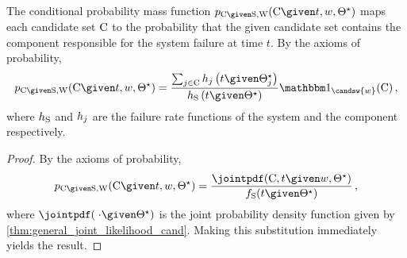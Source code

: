 \documentclass[../main.tex]{subfiles}
\begin{document}
\begin{corollary}
\label{def:general_cond_cand_probability}
The conditional probability mass function $\pmf_{\rvcand \given \sv, \RV{W}}(\cand \given t, w, \tparam\sysparam)$ maps each candidate set $\mathrm{C}$ to the probability that the given candidate set contains the component responsible for the system failure at time $t$. By the axioms of probability,
\begin{equation}
\label{eq:general_cond_cand_probability}
    \pmf_{\rvcand \given \sv, \RV{W}}(\cand \given t, w, \tparam\sysparam) = \frac
    {
        \sum_{j \in \cand} \haz_j\left(t \given \tparam\sysparam_j\right)
    }
    {
        \haz_{\sv}\left(t \given \tparam\sysparam\right)
    } \SetIndicator{\candsw{w}}(\cand)\,,
\end{equation}
where $h_{\mathrm{S}}$ and $h_j$ are the failure rate functions of the system 
and the \jth component respectively.
\end{corollary}
\begin{proof}
By the axioms of probability,
\begin{equation}
    \pmf_{\rvcand \given \sv, \RV{W}}(\cand \given t, w, \tparam\sysparam) = \frac
    {
        \jointpdf(\cand, t \given w, \tparam\sysparam)
    }
    {
        \spdf(t \given \tparam\sysparam)
    }\,,
\end{equation}
where $\jointpdf(\; \cdot \given \tparam\sysparam)$ is the joint probability density function given by \cref{thm:general_joint_likelihood_cand}. Making this substitution immediately yields the result.
\end{proof}
\end{document}
